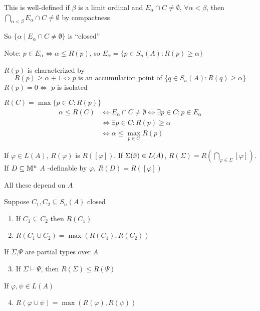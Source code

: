 \documentclass[11pt]{article}
\begin{document}
This is well-defined if \(\beta\) is a limit ordinal and \(E_\alpha\cap C\neq\emptyset\), \(\forall\alpha<\beta\),
then \(\bigcap_{\alpha<\beta} E_\alpha\cap C\neq\emptyset\) by compactness

So \(\{\alpha\mid E_\alpha\cap C\neq\emptyset\}\) is ``closed''

Note: \(p\in E_\alpha\Leftrightarrow\alpha\le R(p)\), so \(E_\alpha=\{p\in S_n(A):R(p)\ge\alpha\}\)

\begin{remark}
\(R(p)\) is characterized by
\begin{equation*}
R(p)\ge\alpha+1\Leftrightarrow p\text{ is an accumulation point of }\{q\in S_n(A):R(q)\ge\alpha\}
\end{equation*}
\(R(p)=0\Leftrightarrow\) \(p\) is isolated
\end{remark}

\begin{remark}
\(R(C)=\max\{p\in C:R(p)\}\)
\begin{align*}
\alpha\le R(C)&\Leftrightarrow E_\alpha\cap C\neq\emptyset\Leftrightarrow\exists p\in C:p\in E_\alpha\\
&\Leftrightarrow\exists p\in C:R(p)\ge\alpha\\
&\Leftrightarrow\alpha\le\max_{p\in C}R(p)
\end{align*}
\end{remark}

\begin{definition}[]
If \(\varphi\in L(A)\), \(R(\varphi)\) is \(R([\varphi])\). If \(\Sigma(\barx)\in L(A)\), \(R(\Sigma)=R(\bigcap_{\varphi\in\Sigma}[\varphi])\). If
\(D\subseteq\mathbb{M}^n\) \(A\) -definable by \(\varphi\), \(R(D)=R([\varphi])\)

All these depend on \(A\)
\end{definition}

\begin{proposition}[]
Suppose \(C_1,C_2\subseteq S_n(A)\) closed
\begin{enumerate}
\item If \(C_1\subseteq C_2\) then \(R(C_1)\)
\item \(R(C_1\cup C_2)=\max(R(C_1),R(C_2))\)
\end{enumerate}
If \(\Sigma\),\(\Psi\) are partial types over \(A\)
\begin{enumerate}
\setcounter{enumi}{2}
\item If \(\Sigma\vdash\Psi\), then \(R(\Sigma)\le R(\Psi)\)
\end{enumerate}
If \(\varphi,\psi\in L(A)\)
\begin{enumerate}
\setcounter{enumi}{3}
\item \(R(\varphi\cup\psi)=\max(R(\varphi),R(\psi))\)
\end{enumerate}
\end{proposition}
\end{document}

